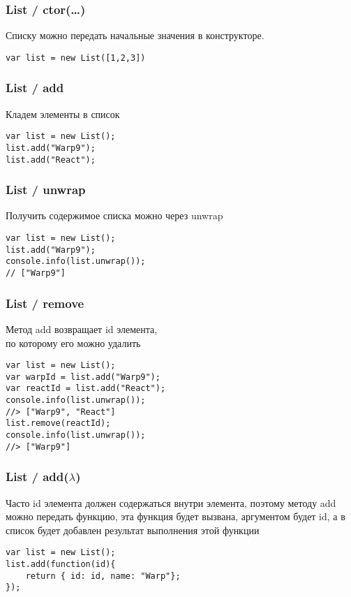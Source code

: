 \documentclass[xetex]{beamer}
\begin{document}
\begin{frame}[fragile]
\frametitle{List / ctor(\dots)}
Списку можно передать начальные значения в конструкторе.

\vspace{10mm}
\begin{lstlisting}
var list = new List([1,2,3])
\end{lstlisting}
\end{frame}


\begin{frame}[fragile]
\frametitle{List / add}
Кладем элементы в список

\vspace{10mm}
\begin{lstlisting}
var list = new List();
list.add("Warp9");
list.add("React");
\end{lstlisting}
\end{frame}


\begin{frame}[fragile]
\frametitle{List / unwrap}
Получить содержимое списка можно через unwrap

\vspace{10mm}
\begin{lstlisting}
var list = new List();
list.add("Warp9");
console.info(list.unwrap()); 
// ["Warp9"]
\end{lstlisting}
\end{frame}


\lstset{
  xleftmargin=.1\textwidth, xrightmargin=.1\textwidth
}


\begin{frame}[fragile]
\frametitle{List / remove}
Метод add возвращает id элемента, \\ по которому его можно удалить

\vspace{6mm}
\begin{lstlisting}
var list = new List();
var warpId = list.add("Warp9");
var reactId = list.add("React");
console.info(list.unwrap()); 
//> ["Warp9", "React"]
list.remove(reactId);
console.info(list.unwrap()); 
//> ["Warp9"]
\end{lstlisting}
\end{frame}


\begin{frame}[fragile]
\frametitle{List / add($\lambda$)}
Часто id элемента должен содержаться внутри элемента, поэтому методу add можно передать функцию, эта функция будет вызвана, аргументом будет id, а в список будет добавлен результат выполнения этой функции

\vspace{10mm}
\begin{lstlisting}
var list = new List();
list.add(function(id){
    return { id: id, name: "Warp"};
});
\end{lstlisting}
\end{frame}
\end{document}

